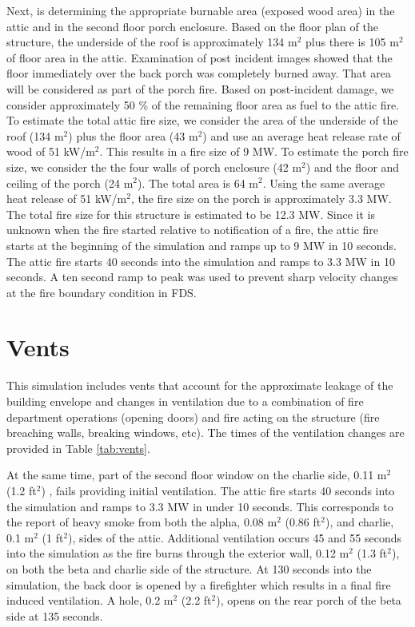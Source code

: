 \documentclass[11pt,oneside]{book}
\begin{document}
Next, is determining the appropriate burnable area (exposed wood area) in the attic and in the second floor porch enclosure. Based on the floor plan of the structure, the underside of the roof is approximately 134 m$^2$ plus there is 105 m$^2$ of floor area in the attic. Examination of post incident images showed that the floor immediately over the back porch was completely burned away. That area will be considered as part of the porch fire. Based on post-incident damage, we consider approximately 50 \% of the remaining floor area as fuel to the attic fire. To estimate the total attic fire size, we consider the area of the underside of the roof (134 m$^2$) plus the floor area (43 m$^2$) and use an average heat release rate of wood of 51 kW/m$^2$. This results in a fire size of 9 MW. To estimate the porch fire size, we consider the the four walls of porch enclosure (42 m$^2$) and the floor and ceiling of the porch (24 m$^2$). The total area is 64 m$^2$. Using the same average heat release of 51 kW/m$^2$, the fire size on the porch is approximately 3.3 MW. The total fire size for this structure is estimated to be 12.3 MW. Since it is unknown when the fire started relative to notification of a fire, the attic fire starts at the beginning of the simulation and ramps up to 9 MW in 10 seconds. The attic fire starts 40 seconds into the simulation and ramps to 3.3 MW in 10 seconds. A ten second ramp to peak was used to prevent sharp velocity changes at the fire boundary condition in FDS.

\section{Vents}
\label{Vents}
This simulation includes vents that account for the approximate leakage of the building envelope and changes in ventilation due to a combination of fire department operations (opening doors) and fire acting on the structure (fire breaching walls, breaking windows, etc). The times of the ventilation changes are provided in Table \ref{tab:vents}.


At the same time, part of the second floor window on the charlie side, 0.11 m$^2$ (1.2 ft$^2$) , fails providing initial ventilation.  The attic fire starts 40 seconds into the simulation and ramps to 3.3 MW in under 10 seconds. This corresponds to the report of heavy smoke from both the alpha, 0.08 m$^2$ (0.86 ft$^2$), and charlie, 0.1 m$^2$ (1 ft$^2$), sides of the attic. Additional ventilation occurs 45 and 55 seconds into the simulation as the fire burns through the exterior wall, 0.12 m$^2$ (1.3 ft$^2$), on both the beta and charlie side of the structure. At 130 seconds into the simulation, the back door is opened by a firefighter which results in a final fire induced ventilation. A hole, 0.2 m$^2$ (2.2 ft$^2$), opens on the rear porch of the beta side at 135 seconds.
\end{document}
